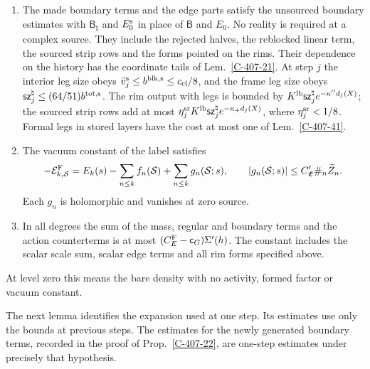 \documentclass[11pt,letterpaper,reqno]{amsart}
\makeatletter
\theoremstyle{definition}
\newcommand{\ms@minorstart}{%
  \pushQED{\qed}\renewcommand{\qedsymbol}{$\blacksquare$}}
\newenvironment{definition}[1][]{\ms@minorstart\ms@definition[#1]}
  {\popQED\endms@definition}
\theoremstyle{remark}
\makeatother
\begin{document}
\begin{definition}[The sourced inductive statement]
\begin{enumerate}
each moved form on its actual polymer $Z_p$, with its own
pointer. The pointed sum rule holds, the source-step sizes
hold, and the scalar entries and their edge parts satisfy
Lem.~\ref{C-407-40}.
\item The made boundary terms and the edge parts satisfy the
unsourced boundary estimates with $\mathsf B_\natural$ and
$E_0^{\rm s}$ in place of $\mathsf B$ and $E_0$. No reality
is required at a complex source. They include the rejected
halves, the reblocked linear term, the sourced strip rows and
the forms pointed on the rims. Their dependence on the history
has the coordinate tails of Lem.~\ref{C-407-21}. At step $j$
the interior leg size obeys
$\bar v_j^{\rm s}\le b^{\rm blk,s}\le c_{\rm cl}/8$,
and the frame leg size obeys
$\mathsf{sz}_j^\natural\le(64/51)b^{\rm tot,s}$.
The rim output with legs is bounded by
$K^{\rm lb}\mathsf{sz}_j^\natural e^{-\kappa''d_j(X)}$;
the sourced strip rows add at most
$\eta_j^{\rm sr}K^{\rm lb}\mathsf{sz}_j^\natural
e^{-\kappa_+d_j(X)}$, where $\eta_j^{\rm sr}<1/8$.
Formal legs in stored layers have the cost at most one of
Lem.~\ref{C-407-41}.
\item The vacuum constant of the label satisfies
\[
 -\mathcal E^{\rm F}_{k,\mathcal S}
   =E_k(s)-\sum_{n\le k}f_n(\mathcal S)
                    +\sum_{n\le k}g_n(\mathcal S;s),
 \qquad |g_n(\mathcal S;s)|\le C'_{\mathfrak E}
                                     \#_n\widetilde Z_n.
\]
Each $g_n$ is holomorphic and vanishes at zero source.
\item In all degrees the sum of the mass, regular and boundary
terms and the action counterterms is at most
$(C_E^{\rm F}-\mathsf c_G)\Sigma'(h)$. The constant includes
the scalar scale sum, scalar edge terms and all rim forms
specified above.
\end{enumerate}
At level zero this means the bare density with no activity,
formed factor or vacuum constant.
\end{definition}

The next lemma identifies the expansion used at one step. Its
estimates use only the bounds at previous steps. The estimates
for the newly generated boundary terms, recorded in the proof of
Prop.~\ref{C-407-22}, are one-step estimates under precisely
that hypothesis.
\end{document}
